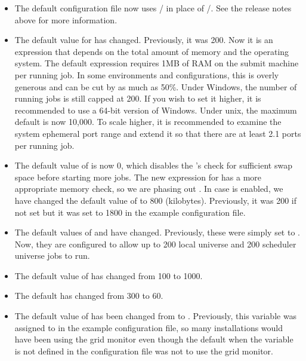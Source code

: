 \begin{itemize}

\item The default configuration file now uses
  / in place of
  /.  See the release notes above
  for more information.

\item The default value for  has changed.
  Previously, it was 200.  Now it is an expression that depends on the
  total amount of memory and the operating system.  The default
  expression requires 1MB of RAM on the submit machine per running
  job.  In some environments and configurations, this is overly
  generous and can be cut by as much as 50\%.  Under Windows, the
  number of running jobs is still capped at 200.  If you wish to set
  it higher, it is recommended to use a 64-bit version of Windows.
  Under unix, the maximum default is now 10,000.  To scale higher, it
  is recommended to examine the system ephemeral port range and extend
  it so that there are at least 2.1 ports per running job.

\item The default value of  is now 0, which
  disables the 's check for sufficient swap space
  before starting more jobs.  The new expression for
   has a more appropriate memory check, so
  we are phasing out .  In case
   is enabled, we have changed the default value
  of  to 800 (kilobytes).  Previously,
  it was 200 if not set but it was set to 1800 in the example configuration
  file.

\item The default values of  and
   have changed.  Previously,
  these were simply set to .  Now, they are configured to allow
  up to 200 local universe and 200 scheduler universe jobs to run.

\item The default value of
   has
  changed from 100 to 1000.

\item The default  has changed from 300 to 60.

\item The default value of  has been
  changed from  to .  Previously, this variable
  was assigned to  in the example configuration file, so
  many installations would have been using the grid monitor even
  though the default when the variable is not defined in the
  configuration file was not to use the grid monitor.

\end{itemize}

